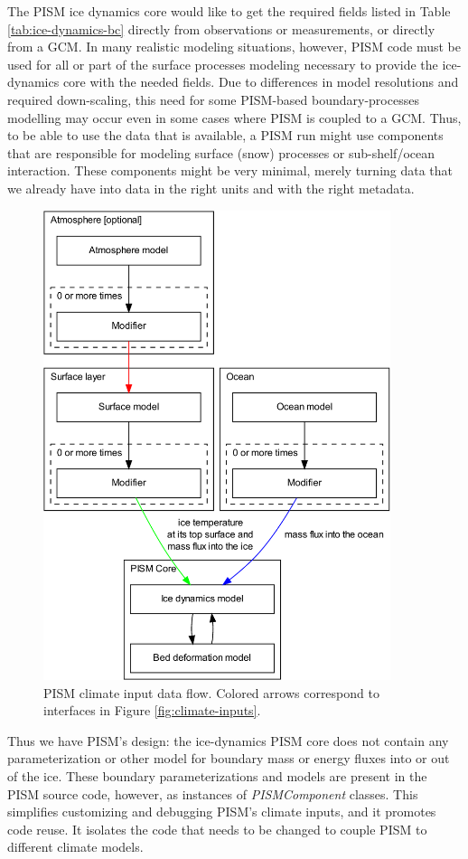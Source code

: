 The PISM ice dynamics core would like to get the required fields listed in Table
\ref{tab:ice-dynamics-bc} directly from observations or measurements, or directly from a GCM.  In many realistic modeling situations, however, PISM code must be used for all or part of the surface processes modeling necessary to provide the ice-dynamics core with the needed fields.  Due to differences in model resolutions and required down-scaling, this need for some PISM-based boundary-processes modelling may occur even in some cases where PISM is coupled to a GCM.  Thus, to be able to use the data that is available, a PISM run might use components that are responsible for modeling surface (snow) processes or sub-shelf/ocean interaction.  These components might be very minimal, merely turning data that we already have into data in the right units and with the right metadata.

\begin{figure}[ht]
  \centering
  \includegraphics[width=4.0in]{figs/data-flow.pdf}
  \caption{PISM climate input data flow. Colored arrows correspond to interfaces in
    Figure \ref{fig:climate-inputs}.}
  \label{fig:climate-input-data-flow}
\end{figure}

Thus we have PISM's design: the ice-dynamics PISM core does not contain any parameterization or other model for boundary mass or energy fluxes into or out of the ice.  These boundary parameterizations and models are present in the PISM source code, however, as instances of \emph{PISMComponent} classes.  This simplifies customizing and debugging PISM's climate inputs, and it promotes code reuse.  It isolates the code that needs to be changed to couple PISM to different climate models.

